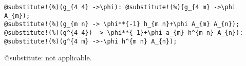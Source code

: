\documentclass[11pt]{article}
\begin{document}
{\color[named]{Blue}\begin{verbatim}
@substitute!(%)(g_{4 4} ->\phi): @substitute!(%){g_{4 m} ->\phi A_{m});
@substitute!(%)(g_{m n} -> \phi**{-1} h_{m n}+\phi A_{m} A_{n});
@substitute!(%)(g^{4 4}) -> \phi**{-1}+\phi a_{m} h^{m n} A_{n}):
@substitute!(%)(g^{4 m} ->-\phi h^{m n} A_{n});
\end{verbatim}}
@substitute: not applicable.
\end{document}
